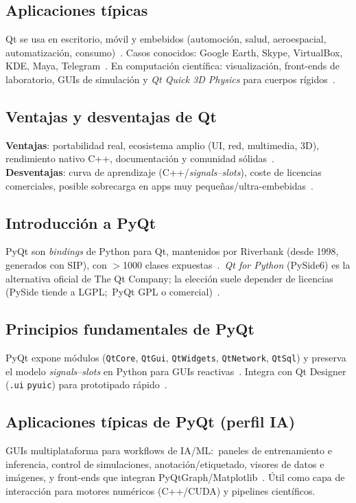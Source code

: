 \subsection{Aplicaciones típicas}
Qt se usa en escritorio, móvil y embebidos (automoción, salud, aeroespacial, automatización, consumo)~\cite{lemberg, qt_wiki}. Casos conocidos: Google Earth, Skype, VirtualBox, KDE, Maya, Telegram~\cite{qt_use_cases}. En computación científica: visualización, front-ends de laboratorio, GUIs de simulación y \emph{Qt Quick 3D Physics} para cuerpos rígidos~\cite{qt_quick, ontosight_pyqt_basics}.

\subsection{Ventajas y desventajas de Qt}
\textbf{Ventajas}: portabilidad real, ecosistema amplio (UI, red, multimedia, 3D), rendimiento nativo C++, documentación y comunidad sólidas~\cite{qt_framework, lemberg, businesscloud}. \\
\textbf{Desventajas}: curva de aprendizaje (C++/\emph{signals–slots}), coste de licencias comerciales, posible sobrecarga en apps muy pequeñas/ultra-embebidas~\cite{qt_wiki, itsupplychain, lemberg}.

\subsection{Introducción a PyQt}
PyQt son \emph{bindings} de Python para Qt, mantenidos por Riverbank (desde 1998, generados con SIP), con $>$1000 clases expuestas~\cite{pyqt_wiki}.\ \emph{Qt for Python} (PySide6) es la alternativa oficial de The Qt Company; la elección suele depender de licencias (PySide tiende a LGPL;\ PyQt GPL o comercial)~\cite{qt_for_python, tutorialspoint_pyqt}.

\subsection{Principios fundamentales de PyQt}
PyQt expone módulos (\texttt{QtCore}, \texttt{QtGui}, \texttt{QtWidgets}, \texttt{QtNetwork}, \texttt{QtSql}) y preserva el modelo \emph{signals–slots} en Python para GUIs reactivas~\cite{tutorialspoint_pyqt, businesscloud}. Integra con Qt Designer (\texttt{.ui} \textrightarrow{} \texttt{pyuic}) para prototipado rápido~\cite{lemberg, tutorialspoint_pyqt}.

\subsection{Aplicaciones típicas de PyQt (perfil IA)}
GUIs multiplataforma para workflows de IA/ML:\ paneles de entrenamiento e inferencia, control de simulaciones, anotación/etiquetado, visores de datos e imágenes, y front-ends que integran PyQtGraph/Matplotlib~\cite{ontosight_pyqt_basics, qt_for_python}. Útil como capa de interacción para motores numéricos (C++/CUDA) y pipelines científicos.

